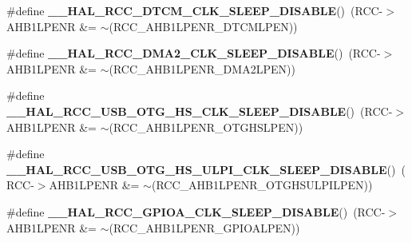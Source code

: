 \begin{DoxyCompactItemize}
\item 
\mbox{\label{group___r_c_c_ex___peripheral___clock___sleep___enable___disable_ga019f911e3c1d4cd92ad8059a816ddcfb}} 
\#define {\bfseries \+\_\+\+\_\+\+H\+A\+L\+\_\+\+R\+C\+C\+\_\+\+D\+T\+C\+M\+\_\+\+C\+L\+K\+\_\+\+S\+L\+E\+E\+P\+\_\+\+D\+I\+S\+A\+B\+LE}()~(R\+CC-\/$>$A\+H\+B1\+L\+P\+E\+NR \&= $\sim$(R\+C\+C\+\_\+\+A\+H\+B1\+L\+P\+E\+N\+R\+\_\+\+D\+T\+C\+M\+L\+P\+EN))
\item 
\mbox{\label{group___r_c_c_ex___peripheral___clock___sleep___enable___disable_ga6af5c50e1a578bcc17c9514c5ab976c9}} 
\#define {\bfseries \+\_\+\+\_\+\+H\+A\+L\+\_\+\+R\+C\+C\+\_\+\+D\+M\+A2\+\_\+\+C\+L\+K\+\_\+\+S\+L\+E\+E\+P\+\_\+\+D\+I\+S\+A\+B\+LE}()~(R\+CC-\/$>$A\+H\+B1\+L\+P\+E\+NR \&= $\sim$(R\+C\+C\+\_\+\+A\+H\+B1\+L\+P\+E\+N\+R\+\_\+\+D\+M\+A2\+L\+P\+EN))
\item 
\mbox{\label{group___r_c_c_ex___peripheral___clock___sleep___enable___disable_ga340ec5b29760feb901ae6b7ed86c243e}} 
\#define {\bfseries \+\_\+\+\_\+\+H\+A\+L\+\_\+\+R\+C\+C\+\_\+\+U\+S\+B\+\_\+\+O\+T\+G\+\_\+\+H\+S\+\_\+\+C\+L\+K\+\_\+\+S\+L\+E\+E\+P\+\_\+\+D\+I\+S\+A\+B\+LE}()~(R\+CC-\/$>$A\+H\+B1\+L\+P\+E\+NR \&= $\sim$(R\+C\+C\+\_\+\+A\+H\+B1\+L\+P\+E\+N\+R\+\_\+\+O\+T\+G\+H\+S\+L\+P\+EN))
\item 
\mbox{\label{group___r_c_c_ex___peripheral___clock___sleep___enable___disable_gacf24f1f20b4159bafb67e7d7d3dc0fe0}} 
\#define {\bfseries \+\_\+\+\_\+\+H\+A\+L\+\_\+\+R\+C\+C\+\_\+\+U\+S\+B\+\_\+\+O\+T\+G\+\_\+\+H\+S\+\_\+\+U\+L\+P\+I\+\_\+\+C\+L\+K\+\_\+\+S\+L\+E\+E\+P\+\_\+\+D\+I\+S\+A\+B\+LE}()~(R\+CC-\/$>$A\+H\+B1\+L\+P\+E\+NR \&= $\sim$(R\+C\+C\+\_\+\+A\+H\+B1\+L\+P\+E\+N\+R\+\_\+\+O\+T\+G\+H\+S\+U\+L\+P\+I\+L\+P\+EN))
\item 
\mbox{\label{group___r_c_c_ex___peripheral___clock___sleep___enable___disable_gad6753edbd9047eeac39ae4f234642942}} 
\#define {\bfseries \+\_\+\+\_\+\+H\+A\+L\+\_\+\+R\+C\+C\+\_\+\+G\+P\+I\+O\+A\+\_\+\+C\+L\+K\+\_\+\+S\+L\+E\+E\+P\+\_\+\+D\+I\+S\+A\+B\+LE}()~(R\+CC-\/$>$A\+H\+B1\+L\+P\+E\+NR \&= $\sim$(R\+C\+C\+\_\+\+A\+H\+B1\+L\+P\+E\+N\+R\+\_\+\+G\+P\+I\+O\+A\+L\+P\+EN))

\end{DoxyCompactItemize}
